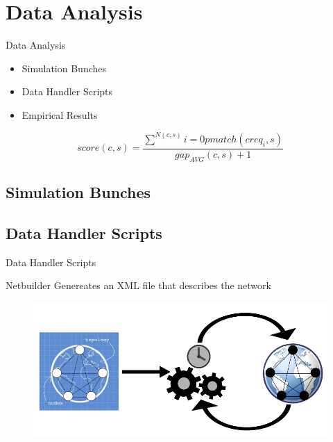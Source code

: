 \section{Data Analysis}

\begin{frame}{Data Analysis}{}
	\begin{itemize}
		\item {Simulation Bunches}
		\item {Data Handler Scripts}
		\item {Empirical Results}
	\end{itemize}
		
		\begin{equation}
			score(c,s) = \frac{\sum\limits^{N(c,s)}{i=0} pmatch(creq_{i},s)}{gap_{AVG}(c,s) + 1}
		\end{equation}

\end{frame}

\subsection{Simulation Bunches}
	

\subsection{Data Handler Scripts}
	\begin{frame}{Data Handler Scripts}
	\end{frame}

	\begin{frame}{Netbuilder}
		Genereates an XML file that describes the network
			
		\begin{figure}[H]
			\centering
			\includegraphics[scale=0.35]{design1.png}
		\end{figure}
	\end{frame}

